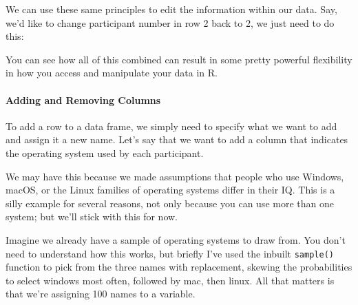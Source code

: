 \documentclass[
]{book}
\newenvironment{Shaded}{\begin{snugshade}}{\end{snugshade}}
\newcommand{\CommentTok}[1]{\textcolor[rgb]{0.56,0.35,0.01}{\textit{#1}}}
\newcommand{\DecValTok}[1]{\textcolor[rgb]{0.00,0.00,0.81}{#1}}
\newcommand{\NormalTok}[1]{#1}
\newcommand{\OtherTok}[1]{\textcolor[rgb]{0.56,0.35,0.01}{#1}}
\newcommand{\SpecialCharTok}[1]{\textcolor[rgb]{0.00,0.00,0.00}{#1}}
\newcommand{\StringTok}[1]{\textcolor[rgb]{0.31,0.60,0.02}{#1}}
\begin{document}
We can use these same principles to edit the information within our data. Say, we'd like to change participant number in row 2 back to 2, we just need to do this:

\begin{Shaded}
\end{Shaded}

You can see how all of this combined can result in some pretty powerful flexibility in how you access and manipulate your data in R.

\hypertarget{adding-and-removing-columns}{%
\paragraph{Adding and Removing Columns}\label{adding-and-removing-columns}}

To add a row to a data frame, we simply need to specify what we want to add and assign it a new name. Let's say that we want to add a column that indicates the operating system used by each participant.

We may have this because we made assumptions that people who use Windows, macOS, or the Linux families of operating systems differ in their IQ. This is a silly example for several reasons, not only because you can use more than one system; but we'll stick with this for now.

Imagine we already have a sample of operating systems to draw from. You don't need to understand how this works, but briefly I've used the inbuilt \texttt{sample()} function to pick from the three names with replacement, skewing the probabilities to select windows most often, followed by mac, then linux. All that matters is that we're assigning 100 names to a variable.
\end{document}
